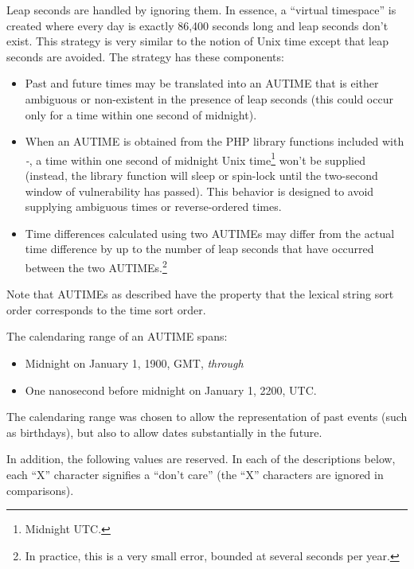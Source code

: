 Leap seconds are handled by ignoring them.
In essence, a ``virtual timespace'' is created where every day is exactly
86,400 seconds long and leap seconds don't exist.  This strategy is
very similar to the notion of Unix time except that leap seconds are
avoided.  The strategy has these components:

\begin{itemize}
\item Past and future times may be translated into an AUTIME that is
      either ambiguous or non-existent in the presence of leap seconds (this could
      occur only for a time within one second of midnight).
\item When an AUTIME is obtained from the PHP library functions included with
      \emph{\productbasename{}-\productversion{}}, a time within one
      second of midnight Unix time\footnote{Midnight UTC.} won't be supplied (instead, the
      library function will sleep or spin-lock 
      until the two-second window of vulnerability has passed).
      This behavior is designed to avoid supplying ambiguous times or
      reverse-ordered times.
\item Time differences calculated using two AUTIMEs may differ from the
      actual time difference by up to the number of leap seconds that
      have occurred between the two AUTIMEs.\footnote{In practice, this
      is a very small error, bounded at several seconds per year.}      
\end{itemize}

Note that AUTIMEs as described have the property that the lexical
string sort order corresponds to the time sort order.

The calendaring range of an AUTIME spans:

\begin{itemize}
\item Midnight on January 1, 1900, GMT, \emph{through}
\item One nanosecond before midnight on January 1, 2200, UTC.
\end{itemize}

\noindent{}The calendaring range was chosen to allow the representation of
past events (such as birthdays), but also to allow dates substantially
in the future. 

In addition, the following values are reserved.
In each of the descriptions below, each ``X'' character
signifies a ``don't care'' (the ``X'' characters
are ignored in comparisons).

